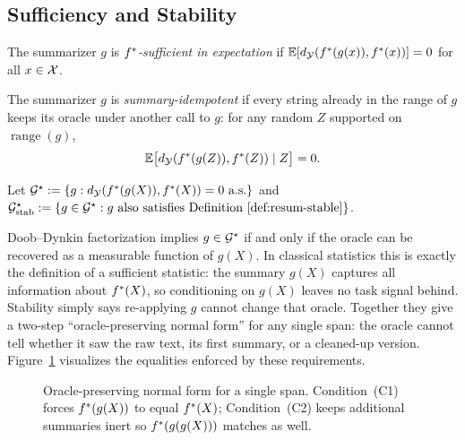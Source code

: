 \subsection{Sufficiency and Stability}

\begin{definition}\label{def:expect-suff}
The summarizer $g$ is \emph{$f^{\ast}$-sufficient in expectation} if $\mathbb{E}[d_{\mathcal{Y}}(f^{\ast}(g(x)), f^{\ast}(x))] = 0$ for all $x \in \mathcal{X}$.
\end{definition}

\begin{definition}\label{def:resum-stable}
The summarizer $g$ is \emph{summary-idempotent} if every string already in the range of $g$ keeps its oracle under another call to $g$: for any random $Z$ supported on $\operatorname{range}(g)$,
\[
\mathbb{E}\big[d_{\mathcal{Y}}(f^{\ast}(g(Z)), f^{\ast}(Z)) \mid Z\big] = 0.
\]
\end{definition}

\begin{definition}\label{def:exact-suff-stable}
Let $\mathcal{G}^\star := \{g : d_{\mathcal{Y}}(f^{\ast}(g(X)), f^{\ast}(X)) = 0\ \text{a.s.}\}$ and $\mathcal{G}^\star_{\mathrm{stab}} := \{g \in \mathcal{G}^\star : \text{$g$ also satisfies Definition~\ref{def:resum-stable}}\}$.
\end{definition}

Doob--Dynkin factorization implies $g \in \mathcal{G}^\star$ if and only if the oracle can be recovered as a measurable function of $g(X)$. In classical statistics this is exactly the definition of a sufficient statistic: the summary $g(X)$ captures all information about $f^{\ast}(X)$, so conditioning on $g(X)$ leaves no task signal behind. Stability simply says re-applying $g$ cannot change that oracle. Together they give a two-step ``oracle-preserving normal form'' for any single span: the oracle cannot tell whether it saw the raw text, its first summary, or a cleaned-up version. Figure~\ref{fig:gstar} visualizes the equalities enforced by these requirements.

\begin{figure}[t]
    \centering
    \caption{Oracle-preserving normal form for a single span. Condition~(C1) forces $f^{\ast}(g(X))$ to equal $f^{\ast}(X)$; Condition~(C2) keeps additional summaries inert so $f^{\ast}(g(g(X)))$ matches as well.}
    \label{fig:gstar}
\end{figure}

